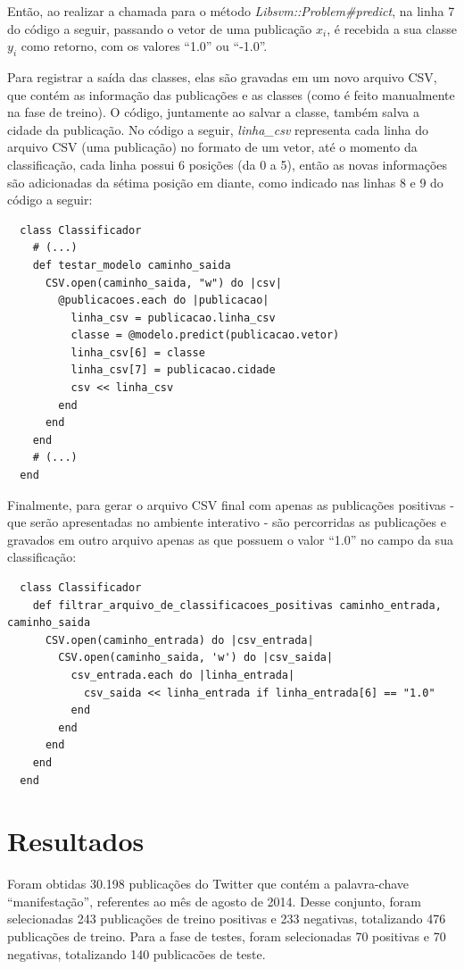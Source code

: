 Então, ao realizar a chamada para o método \textit{Libsvm::Problem\#predict}, na linha 7 do código a seguir, passando o vetor de uma publicação ${x}_{i}$, é recebida a sua classe ${y}_{i}$ como retorno, com os valores ``1.0'' ou ``-1.0''.

Para registrar a saída das classes, elas são gravadas em um novo arquivo CSV, que contém as informação das publicações e as classes (como é feito manualmente na fase de treino). O código, juntamente ao salvar a classe, também salva a cidade da publicação. No código a seguir, \textit{linha\_csv} representa cada linha do arquivo CSV (uma publicação) no formato de um vetor, até o momento da classificação, cada linha possui 6 posições (da 0 a 5), então as novas informações são adicionadas da sétima posição em diante, como indicado nas linhas 8 e 9 do código a seguir:

\begin{lstlisting}
  class Classificador
    # (...)
    def testar_modelo caminho_saida
      CSV.open(caminho_saida, "w") do |csv|
        @publicacoes.each do |publicacao|
          linha_csv = publicacao.linha_csv
          classe = @modelo.predict(publicacao.vetor)
          linha_csv[6] = classe
          linha_csv[7] = publicacao.cidade
          csv << linha_csv
        end
      end
    end
    # (...)
  end
\end{lstlisting}

Finalmente, para gerar o arquivo CSV final com apenas as publicações positivas - que serão apresentadas no ambiente interativo - são percorridas as publicações e gravados em outro arquivo apenas as que possuem o valor ``1.0'' no campo da sua classificação:

\begin{lstlisting}
  class Classificador
    def filtrar_arquivo_de_classificacoes_positivas caminho_entrada, caminho_saida
      CSV.open(caminho_entrada) do |csv_entrada|
        CSV.open(caminho_saida, 'w') do |csv_saida|
          csv_entrada.each do |linha_entrada|
            csv_saida << linha_entrada if linha_entrada[6] == "1.0"
          end
        end
      end
    end
  end
\end{lstlisting}

\section{Resultados}

Foram obtidas 30.198 publicações do Twitter que contém a palavra-chave ``manifestação'', referentes ao mês de agosto de 2014. Desse conjunto, foram selecionadas 243 publicações de treino positivas e 233 negativas, totalizando 476 publicações de treino. Para a fase de testes, foram selecionadas 70 positivas e 70 negativas, totalizando 140 publicacões de teste.

